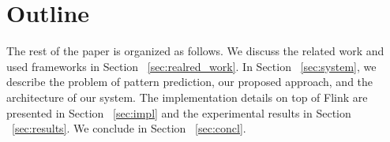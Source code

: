   
\section{Outline }

\par The rest of the paper is organized as follows. We discuss the related work and used frameworks in Section ~\ref{sec:realred_work}. In Section ~\ref{sec:system}, we describe the problem of pattern prediction, our proposed approach, and the architecture of our system. The implementation details on top of Flink are presented in Section ~\ref{sec:impl} and the experimental results in Section ~\ref{sec:results}. We conclude in Section ~\ref{sec:concl}.



